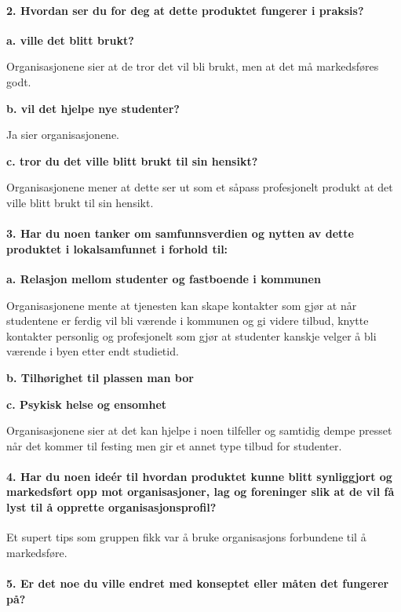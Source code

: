 \paragraph{2. Hvordan ser du for deg at dette produktet fungerer i praksis?}

{\bf a. ville det blitt brukt?}

Organisasjonene sier at de tror det vil bli brukt, men at det må markedsføres godt.

{\bf b. vil det hjelpe nye studenter?}

Ja sier organisasjonene.

{\bf c. tror du det ville blitt brukt til sin hensikt?}

Organisasjonene mener at dette ser ut som et såpass profesjonelt produkt at det ville blitt brukt til sin hensikt.

\paragraph{3. Har du noen tanker om samfunnsverdien og nytten av dette produktet i lokalsamfunnet i forhold til:}

{\bf a. Relasjon mellom studenter og fastboende i kommunen}

Organisasjonene mente at tjenesten kan skape kontakter som gjør at når studentene er ferdig vil bli værende i kommunen og gi videre tilbud, knytte kontakter personlig og profesjonelt som gjør at studenter kanskje velger å bli værende i byen etter endt studietid.

{\bf b. Tilhørighet til plassen man bor}



{\bf c. Psykisk helse og ensomhet}

Organisasjonene sier at det kan hjelpe i noen tilfeller og samtidig dempe presset når det kommer til festing men gir et annet type tilbud for studenter.

\paragraph{4. Har du noen ideér til hvordan produktet kunne blitt synliggjort og markedsført opp mot organisasjoner, lag og foreninger slik at de vil få lyst til å opprette organisasjonsprofil?}

Et supert tips som gruppen fikk var å bruke organisasjons forbundene til å markedsføre.

\paragraph{5. Er det noe du ville endret med konseptet eller måten det fungerer på?}


